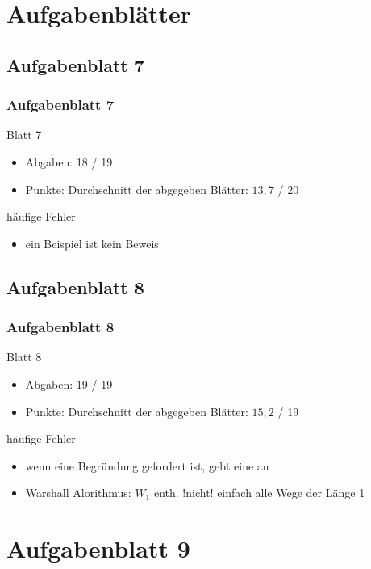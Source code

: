 \section[Rückblick]{Aufgabenblätter}

\subsection{Aufgabenblatt 7}
\begin{frame}
	\frametitle{Aufgabenblatt 7}
	\begin{block}{Blatt 7}
		\begin{itemize}
			\item Abgaben: 18 / 19
			\item Punkte: Durchschnitt der abgegeben Blätter: $13,7$ / 20
		\end{itemize}
   \end{block}
	\begin{block}{häufige Fehler}
 		\begin{itemize}
 	  		\item[7.3] ein Beispiel ist kein Beweis
 	  \end{itemize}
	\end{block}
\end{frame}

\subsection{Aufgabenblatt 8}
\begin{frame}
	\frametitle{Aufgabenblatt 8}
	\begin{block}{Blatt 8}
		\begin{itemize}
			\item Abgaben: 19 / 19
			\item Punkte: Durchschnitt der abgegeben Blätter: $15,2$ / 19
		\end{itemize}
   \end{block}
	\begin{block}{häufige Fehler}
 		\begin{itemize}
 	  		\item[8.2c] wenn eine Begründung gefordert ist, gebt eine an \pause
 	  		\item[8.3] Warshall Alorithmus: $W_1$ enth. !nicht! einfach alle Wege der Länge 1
 	  \end{itemize}
	\end{block}
\end{frame}

\section[Blatt 9]{Aufgabenblatt 9}

